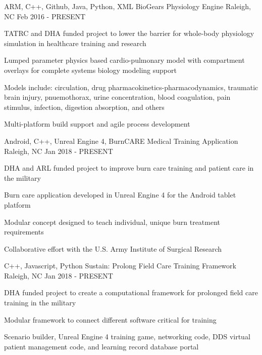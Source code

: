 
\begin{cventries}

  \cventry
    {ARM, C++, Github, Java, Python, XML} %
    {BioGears Physiology Engine} %
    {Raleigh, NC} %
    {Feb 2016 - PRESENT} %
    {
      \begin{cvitems} %
      \item{TATRC and DHA funded project to lower the barrier for whole-body physiology simulation in healthcare training and research}
        \item {Lumped parameter physics based cardio-pulmonary model with compartment overlays for complete systems biology modeling support}
        \item {Models include: circulation, drug pharmacokinetics-pharmacodynamics, traumatic brain injury, pnuemothorax, urine concentration, blood coagulation, pain stimulus, infection, digestion absorption, and others}
		    \item {Multi-platform build support and agile process development}
      \end{cvitems}
    }

  \cventry
    {Android, C++, Unreal Engine 4,} %
    {BurnCARE Medical Training Application} %
    {Raleigh, NC} %
    {Jan 2018 - PRESENT} %
    {
      \begin{cvitems} %
      \item{DHA and ARL funded project to improve burn care training and patient care in the military}
      	\item {Burn care application developed in Unreal Engine 4 for the Android tablet platform}
		    \item {Modular concept designed to teach individual, unique burn treatment requirements}
        \item {Collaborative effort with the U.S. Army Institute of Surgical Research}
      \end{cvitems}
    }

  \cventry
    {C++, Javascript, Python} %
    {Sustain: Prolong Field Care Training Framework } %
    {Raleigh, NC} %
    {Jan 2018 - PRESENT} %
    {
      \begin{cvitems} %
      \item {DHA funded project to create a computational framework for prolonged field care training in the military}
        \item {Modular framework to connect different software critical for training}
        \item {Scenario builder, Unreal Engine 4 training game, networking code, DDS virtual patient management code, and learning record database portal}
      \end{cvitems}
    }


\end{cventries}
